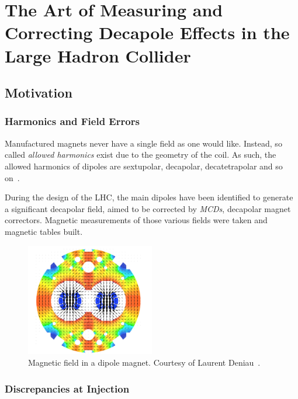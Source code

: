 \chapter{The Art of Measuring and Correcting Decapole Effects in the Large Hadron Collider}
\thumbforchapter{}
\chaptertoc{}
\newpage

\section{Motivation}

\subsection{Harmonics and Field Errors}

Manufactured magnets never have a single field as one would like. Instead, so called 
\textit{allowed harmonics} exist due to the geometry of the coil. As such, the allowed harmonics of
dipoles are sextupolar, decapolar, decatetrapolar and so on~\cite{deniau_magnetic_2009}.

During the design of the LHC, the main dipoles have been identified to generate a significant 
decapolar field, aimed to be corrected by \textit{MCDs}, decapolar magnet correctors.
Magnetic measurements of those various fields were taken and magnetic tables built.

\begin{figure}[H]
    \centering
    \includegraphics[width=0.5\textwidth]{./images/main_dipole_fields.png}
    \caption{Magnetic field in a dipole magnet. Courtesy of Laurent
    Deniau~\cite{deniau_magnetic_2009}.}
    \label{fig:decapoles:magnetic_field_dipole}
\end{figure}


\subsection{Discrepancies at Injection}


